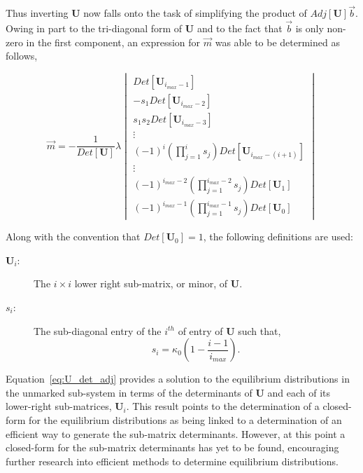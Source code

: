 \documentclass[review]{elsarticle}
\let\bs\boldsymbol
\begin{document}
Thus inverting $\bs{U}$ now falls onto the task of simplifying the product of $Adj[\bs{U}]\vec{b}$.  Owing in part to the tri-diagonal form of $\bs{U}$ and to the fact that $\vec{b}$ is only non-zero in the first component, an expression for $\vec{m}$ was able to be determined as follows,

\begin{equation}\label{eq:U_det_adj}
\vec{m}=-\frac{1}{Det[\bs{U}]}\lambda\begin{vmatrix}Det[\bs{U}_{i_{max}-1}]\\
-s_{1}Det[\bs{U}_{i_{max}-2}]\\
s_{1}s_{2}Det[\bs{U}_{i_{max}-3}]\\
\vdots\\
(-1)^{i}(\prod_{j=1}^{i}s_{j})Det[\bs{U}_{i_{max}-(i+1)}]\\
\vdots\\
(-1)^{i_{max}-2}(\prod_{j=1}^{i_{max}-2}s_{j})Det[\bs{U}_1]\\
(-1)^{i_{max}-1}(\prod_{j=1}^{i_{max}-1}s_{j})Det[\bs{U}_0]
\end{vmatrix}
\end{equation}

Along with the convention that $Det[\bs{U}_0]=1$, the following definitions are used:
\begin{description}
\item[{ $\bs{U}_{i}$:}] The $i\times i$ lower right sub-matrix, or minor, of $\bs{U}$.  
\item[{ $s_{i}$:}] The sub-diagonal entry of the $i^{th}$ of entry of $\bs{U}$ such that, \begin{equation*} s_{i}=\kappa_0\left(1-\frac{i-1}{i_{max}}\right). \end{equation*}
\end{description}

Equation~\ref{eq:U_det_adj} provides a solution to the equilibrium distributions in the unmarked sub-system in terms of the determinants of $\bs{U}$ and each of its lower-right sub-matrices, $\bs{U}_i$. This result points to the determination of a closed-form for the equilibrium distributions as being linked to a determination of an efficient way to generate the sub-matrix determinants.  However, at this point a closed-form for the sub-matrix determinants has yet to be found, encouraging further research into efficient methods to determine equilibrium distributions.
\end{document}
